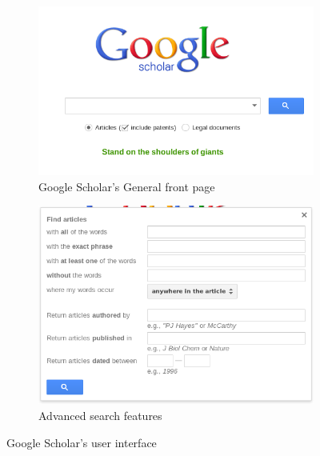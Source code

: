 \documentclass[12pt,a4paper]{article}
\begin{document}
\begin{figure}[!hbt]
        \centering
        \begin{subfigure}[b]{0.50\textwidth}
                \centering
                \includegraphics[width=\textwidth]{images/googlescholar_front.png}
                \caption{Google Scholar's General front page}
                \label{fig:scholar_basic}
        \end{subfigure}%
        \begin{subfigure}[b]{0.50\textwidth}
                \centering
                \includegraphics[width=\textwidth]{images/googlescholar_advanced.png}
                \caption{Advanced search features}
                \label{fig:scholar_advanced}
        \end{subfigure}

        \caption{Google Scholar's user interface}
        \label{fig:scholar_interface}
\end{figure}
\end{document}
